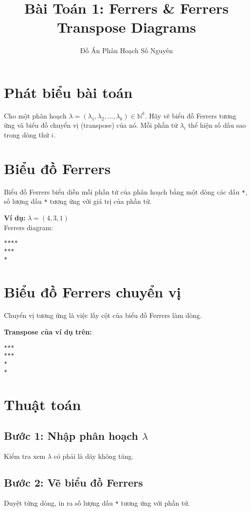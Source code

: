 \documentclass[12pt]{article}
\title{Bài Toán 1: Ferrers \& Ferrers Transpose Diagrams}
\author{Đồ Án Phân Hoạch Số Nguyên}
\date{}
\begin{document}
\maketitle

\section*{Phát biểu bài toán}
Cho một phân hoạch $\lambda = (\lambda_1, \lambda_2, \ldots, \lambda_k) \in \mathbb{N}^k$. Hãy vẽ biểu đồ Ferrers tương ứng và biểu đồ chuyển vị (transpose) của nó. Mỗi phần tử $\lambda_i$ thể hiện số dấu sao trong dòng thứ $i$.

\section*{Biểu đồ Ferrers}
Biểu đồ Ferrers biểu diễn mỗi phần tử của phân hoạch bằng một dòng các dấu \texttt{*}, số lượng dấu \texttt{*} tương ứng với giá trị của phần tử.

\textbf{Ví dụ:} $\lambda = (4, 3, 1)$ \\
Ferrers diagram:
\begin{Verbatim}
****
***
*
\end{Verbatim}

\section*{Biểu đồ Ferrers chuyển vị}
Chuyển vị tương ứng là việc lấy cột của biểu đồ Ferrers làm dòng.

\textbf{Transpose của ví dụ trên:}
\begin{Verbatim}
***
***
*
*
\end{Verbatim}

\section*{Thuật toán}

\subsection*{Bước 1: Nhập phân hoạch $\lambda$}
Kiểm tra xem $\lambda$ có phải là dãy không tăng.

\subsection*{Bước 2: Vẽ biểu đồ Ferrers}
Duyệt từng dòng, in ra số lượng dấu \texttt{*} tương ứng với phần tử.
\end{document}
